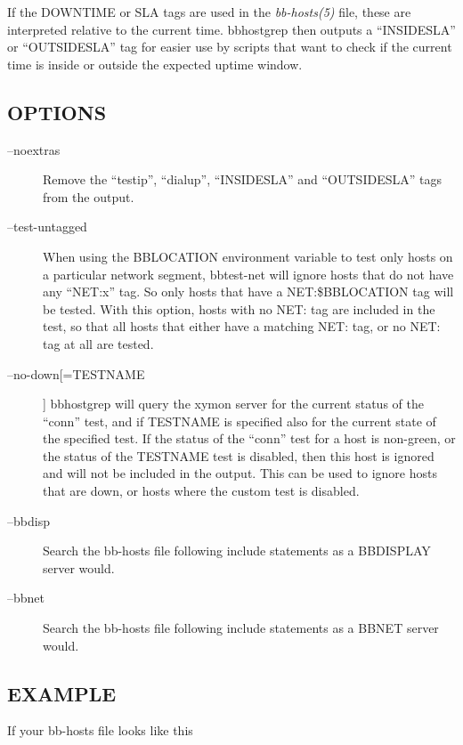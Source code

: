   If the DOWNTIME or SLA tags are used in the \emph{bb-hosts(5)} file,
  these are interpreted relative to the current time. bbhostgrep then
  outputs a ``INSIDESLA'' or ``OUTSIDESLA'' tag for easier use by
  scripts that want to check if the current time is inside or outside
  the expected uptime window. 



 
\subsection{OPTIONS}
\begin{description}
\item[--noextras] Remove the ``testip'', ``dialup'', ``INSIDESLA'' and ``OUTSIDESLA'' tags from the output. 

 

\item[--test-untagged] When using the BBLOCATION environment variable
  to test only hosts on a particular network segment, bbtest-net will
  ignore hosts that do not have any ``NET:x'' tag. So only hosts that
  have a NET:\$BBLOCATION tag will be tested.   With this option,
  hosts with no NET: tag are included in the test, so that all hosts
  that either have a matching NET: tag, or no NET: tag at all are
  tested. 


 

\item[--no-down[=TESTNAME]] bbhostgrep will query the xymon server
  for the current status of the ``conn'' test, and if TESTNAME is
  specified also for the current state of the specified test. If the
  status of the ``conn'' test for a host is non-green, or the status
  of the TESTNAME test is disabled, then this host is ignored and will
  not be included in the output. This can be used to ignore hosts that
  are down, or hosts where the custom test is disabled. 


 

\item[--bbdisp] Search the bb-hosts file following include statements
  as a BBDISPLAY server would. 


 

\item[--bbnet] Search the bb-hosts file following include statements
  as a BBNET server would. 


 


\end{description}
\subsection{EXAMPLE}
 If your bb-hosts file looks like this 

